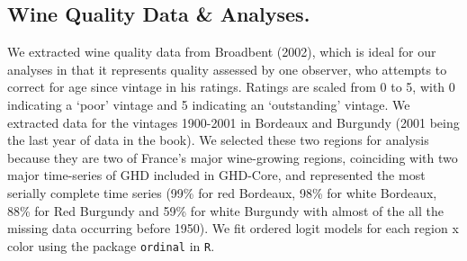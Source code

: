 \documentclass[final]{nature}
\begin{document}
\begin{methods}
\subsection{Wine Quality Data \& Analyses.}
We extracted wine quality data from Broadbent (2002)\cite{Broadbent2002}, which is ideal for our analyses in that it represents quality assessed by one observer, who attempts to correct for age since vintage in his ratings. Ratings are scaled from 0 to 5, with 0 indicating a `poor' vintage and 5 indicating an `outstanding' vintage. We extracted data for the vintages 1900-2001 in Bordeaux and Burgundy (2001 being the last year of data in the book). We selected these two regions for analysis because they are two of France's major wine-growing regions, coinciding with two major time-series of GHD included in GHD-Core, and represented the most serially complete time series (99\% for red Bordeaux, 98\% for white Bordeaux, 88\% for Red Burgundy and 59\% for white Burgundy with almost of the all the missing data occurring before 1950). We fit ordered logit models for each region x color using the package \verb|ordinal| in \verb|R|\cite{Rcore2014}.

\end{methods}






\end{document}
